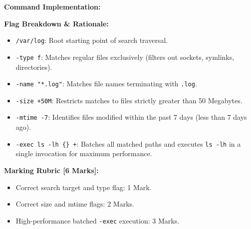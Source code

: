 \begin{examsol}
\textbf{Command Implementation:}

\textbf{Flag Breakdown \& Rationale:}
\begin{itemize}[leftmargin=1.5em]
    \item \texttt{/var/log}: Root starting point of search traversal.
    \item \texttt{-type f}: Matches regular files exclusively (filters out sockets, symlinks, directories).
    \item \texttt{-name "*.log"}: Matches file names terminating with \texttt{.log}.
    \item \texttt{-size +50M}: Restricts matches to files strictly greater than 50 Megabytes.
    \item \texttt{-mtime -7}: Identifies files modified within the past 7 days (less than 7 days ago).
    \item \texttt{-exec ls -lh \{\} +}: Batches all matched paths and executes \texttt{ls -lh} in a single invocation for maximum performance.
\end{itemize}

\begin{markingrubric}
\textbf{Marking Rubric [6 Marks]:}
\begin{itemize}[leftmargin=1.5em]
    \item Correct search target and type flag: 1 Mark.
    \item Correct size and mtime flags: 2 Marks.
    \item High-performance batched \texttt{-exec} execution: 3 Marks.
\end{itemize}
\end{markingrubric}
\end{examsol}


